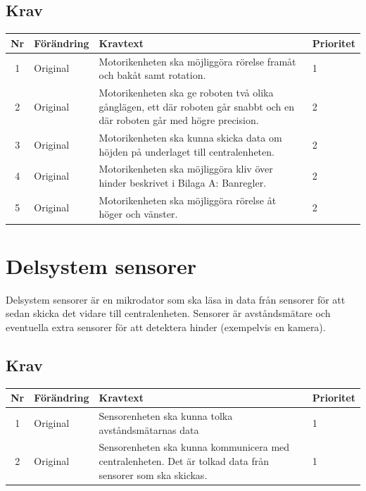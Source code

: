 \documentclass[a4paper,titlepage,12pt]{article}
\begin{document}
	\subsection{Krav}
	\begin{table}[h!]
		\label{tab:label}
		\begin{tabularx}{\textwidth}{|c|l|X|l|}
			\hline
			\textbf{Nr} & \textbf{Förändring} & \textbf{Kravtext} & \textbf{Prioritet} 
				\\ \hline

			1 & Original & Motorikenheten ska möjliggöra rörelse framåt och bakåt samt rotation. & 1
				\\ \hline

			2 & Original & Motorikenheten ska ge roboten två olika gånglägen, ett där roboten går 
				snabbt och en där roboten går med högre precision.& 2
				\\ \hline

			3 & Original & Motorikenheten ska kunna skicka data om höjden på underlaget
  				till centralenheten. & 2
				\\ \hline

			4 & Original & Motorikenheten ska möjliggöra kliv över hinder beskrivet i Bilaga A:
  				Banregler. & 2
				\\ \hline

			5 & Original & Motorikenheten ska möjliggöra rörelse åt höger och vänster. & 2 \\\hline
		\end{tabularx}
	\end{table}


	\section{Delsystem sensorer}
	Delsystem sensorer är en mikrodator som ska läsa in data från sensorer för att sedan skicka 
	det vidare till centralenheten. Sensorer är avståndsmätare och eventuella extra sensorer 
	för att detektera hinder (exempelvis en kamera).

	\subsection{Krav}
	\begin{table}[h!]
		\label{tab:label}
		\begin{tabularx}{\textwidth}{|c|l|X|l|}
			\hline
			\textbf{Nr} & \textbf{Förändring} & \textbf{Kravtext} & \textbf{Prioritet} 
				\\ \hline

			1 & Original & Sensorenheten ska kunna tolka avståndsmätarnas data & 1
				\\ \hline

			2 & Original & Sensorenheten ska kunna kommunicera med centralenheten. Det är 
				tolkad data från sensorer som ska skickas.& 1
				\\ \hline

		\end{tabularx}
	\end{table}
\end{document}
